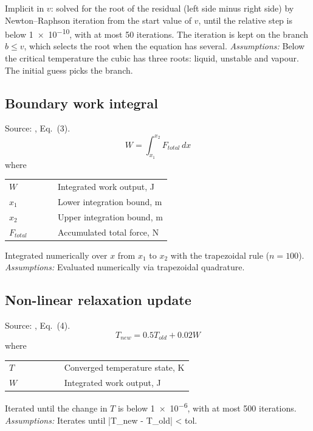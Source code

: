 \noindent Implicit in $v$: solved for the root of the residual (left side minus right side) by Newton–Raphson iteration from the start value of $v$, until the relative step is below \num{1e-10}, with at most 50 iterations. The iteration is kept on the branch $b \le v$, which selects the root when the equation has several. \textit{Assumptions:} Below the critical temperature the cubic has three roots: liquid, unstable and vapour. The initial guess picks the branch.

\subsection{Boundary work integral}
Source: \cite{clapeyron1834}, Eq.~(3).
\begin{equation}
  W = \int_{x_1}^{x_2} F_{total} \, dx
  \label{eq:boundary-work-integral}
\end{equation}
\noindent where

\noindent\begin{tabular}{@{\quad}l@{\quad}p{0.7\linewidth}@{}}
  $W$ & Integrated work output, \si{J} \\
  $x_1$ & Lower integration bound, \si{m} \\
  $x_2$ & Upper integration bound, \si{m} \\
  $F_{total}$ & Accumulated total force, \si{N} \\
\end{tabular}

\noindent Integrated numerically over $x$ from $x_1$ to $x_2$ with the trapezoidal rule ($n = 100$). \textit{Assumptions:} Evaluated numerically via trapezoidal quadrature.

\subsection{Non-linear relaxation update}
Source: \cite{refc}, Eq.~(4).
\begin{equation}
  T_{new} = 0.5 T_{old} + 0.02 W
  \label{eq:non-linear-relaxation-update}
\end{equation}
\noindent where

\noindent\begin{tabular}{@{\quad}l@{\quad}p{0.7\linewidth}@{}}
  $T$ & Converged temperature state, \si{K} \\
  $W$ & Integrated work output, \si{J} \\
\end{tabular}

\noindent Iterated until the change in $T$ is below \num{1e-6}, with at most 500 iterations. \textit{Assumptions:} Iterates until |T\_new - T\_old| < tol.

